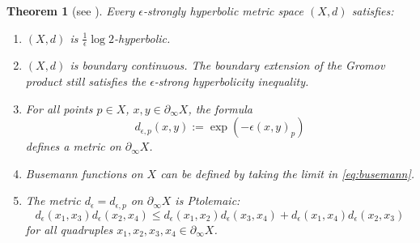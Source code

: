 \documentclass[12pt]{amsbook}%
\newtheorem{thm}{Theorem}[chapter]
\theoremstyle{definition}
\theoremstyle{remark}
\numberwithin{section}{chapter}
\numberwithin{subsection}{section}
\numberwithin{figure}{chapter}
\def\eps{\epsilon}
\def\geo{\partial_\infty}
\def\ol{\overline}
\begin{document}
\begin{thm}
[see \cite{Nica-Spakula}] \label{thm:strongly}
Every $\epsilon$-strongly hyperbolic metric space $(X,d)$ satisfies:

\begin{enumerate}
\item $(X,d)$ is $\frac{1}{\eps}\log 2$-hyperbolic. %

\item $(X,d)$ is boundary continuous. 
 The boundary extension of the Gromov product still satisfies 
the $\eps$-strong hyperbolicity inequality. %

\item For all points $p\in X$, $x, y\in \geo X$, the formula %
$$
d_{\eps,p}(x,y):= \exp(-\eps(x,y)_p)
$$
defines a metric on $\geo X$. 

\item Busemann functions on $X$ can be defined by taking the limit in \eqref{eq:busemann}. %

\item The metric $d_\eps=d_{\eps,p}$ on $\geo X$ is {\em Ptolemaic}: %
$$
d_\eps(x_1, x_3) d_\eps(x_2, x_4)\leqslant d_\eps(x_1, x_2) d_\eps(x_3, x_4)+ d_\eps(x_1,x_4) d_\eps(x_2, x_3)
$$
for all quadruples $x_1, x_2, x_3, x_4\in \geo X$. 
\end{enumerate}
\end{thm}
\end{document}
